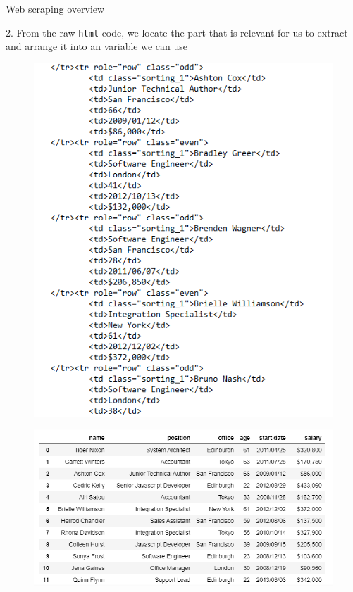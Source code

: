 \documentclass[aspectratio=169]{beamer}
\begin{document}
\begin{frame}{Web scraping overview}

	2. From the raw \texttt{html} code, we locate the part that is relevant for us to extract and arrange it into an variable we can use

	\begin{multicols}{2}

		\begin{figure}
			\centering
			\includegraphics[width=0.7\linewidth]{img/html_relevant.png}
		\end{figure}
		\begin{figure}
			\centering
			\includegraphics[width=\linewidth]{img/html_final.png}
		\end{figure}

	\end{multicols}

\end{frame}
\end{document}
